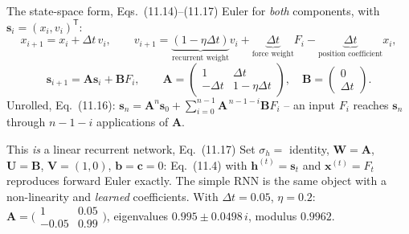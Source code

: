 \documentclass[10pt,aspectratio=169]{beamer}
\begin{document}
\begin{frame}{The state-space form, Eqs.~(11.14)--(11.17)}
Euler for \emph{both} components, with $\bm{s}_i=(x_i,v_i)^{\mathsf{T}}$:
\[
  x_{i+1}=x_i+\Delta t\,v_i,\qquad
  v_{i+1}=\underbrace{(1-\eta\Delta t)}_{\text{recurrent weight}}v_i
         +\underbrace{\Delta t}_{\text{force weight}}F_i
         -\underbrace{\Delta t}_{\text{position coefficient}}x_i,
\]
\[
  \bm{s}_{i+1}=\bm{A}\bm{s}_i+\bm{B}F_i,\qquad
  \bm{A}=\begin{pmatrix}1&\Delta t\\-\Delta t&1-\eta\Delta t\end{pmatrix},\quad
  \bm{B}=\begin{pmatrix}0\\ \Delta t\end{pmatrix}.
\]
Unrolled, Eq.~(11.16):
$\bm{s}_n=\bm{A}^n\bm{s}_0+\sum_{i=0}^{n-1}\bm{A}^{\,n-1-i}\bm{B}F_i$ -- an
input $F_i$ reaches $\bm{s}_n$ through $n-1-i$ applications of $\bm{A}$.
\begin{block}{This \emph{is} a linear recurrent network, Eq.~(11.17)}
Set $\sigma_h=$ identity, $\bm{W}=\bm{A}$, $\bm{U}=\bm{B}$, $\bm{V}=(1,0)$,
$\bm{b}=\bm{c}=0$: Eq.~(11.4) with $\bm{h}^{(t)}=\bm{s}_t$ and
$\bm{x}^{(t)}=F_t$ reproduces forward Euler exactly.  The simple RNN is the
same object with a non-linearity and \emph{learned} coefficients.  With
$\Delta t=0.05$, $\eta=0.2$: $\bm{A}=\bigl(\begin{smallmatrix}1&0.05\\-0.05&0.99\end{smallmatrix}\bigr)$,
eigenvalues $0.995\pm0.0498\,i$, modulus $0.9962$.
\end{block}
\end{frame}
\end{document}
